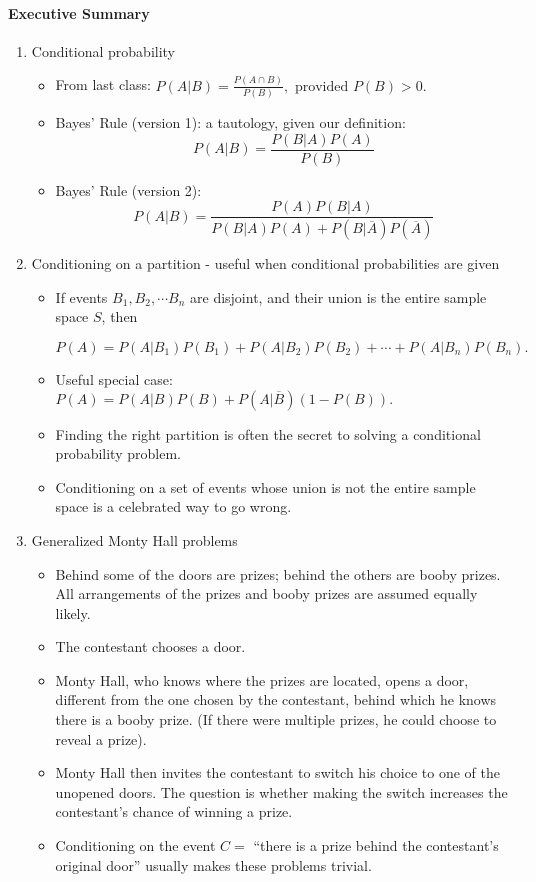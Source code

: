 \documentclass[12pt]{article}
\begin{document}
\paragraph*{Executive Summary}
\begin{enumerate}

\item Conditional probability
\begin{itemize}
\item From last class: $P(A | B) = \frac{P(A \cap B)}{P(B)}, \text{ provided } P(B) > 0.$

\item Bayes' Rule (version 1): a tautology, given our definition:  $$P(A | B) = \frac{P(B | A)P(A)}{P(B)}$$

\item Bayes' Rule (version 2): $$P(A | B) = \frac{P(A)P(B | A)}{P(B | A)P(A) + P(B|\overline{A})P(\overline{A})}$$
\end{itemize}

\item Conditioning on a partition - useful when conditional probabilities are given
\begin{itemize}
\item If events $B_1, B_2, \cdots B_n$ are disjoint, and their union is the entire sample space $S$, then

$P(A) = P(A | B_1)P(B_1) +  P(A | B_2)P(B_2) +  \cdots + P(A | B_n)P(B_n).$
\item Useful special case: $P(A) = P(A | B)P(B) +  P(A | \overline{B})(1-P(B)).$
\item Finding the right partition is often the secret to solving a conditional probability problem.
\item Conditioning on a set of events whose union is not the entire sample space is a celebrated way to go wrong.
\end{itemize}
\item Generalized Monty Hall problems

\begin{itemize}
\item Behind some of the doors are prizes; behind the others are booby prizes. All arrangements of the prizes and booby prizes are assumed equally likely.
\item The contestant chooses a door.
\item Monty Hall, who knows where the prizes are located, opens a door, different from the one chosen by the contestant, behind which he knows there is a booby prize. (If there were multiple prizes, he could choose to reveal a prize).
\item Monty Hall then invites the contestant to switch his choice to one of the unopened doors. The question is whether making the switch increases the contestant's chance of winning a prize.
\item Conditioning on the event $C=$ ``there is a prize behind the contestant's original door'' usually makes these problems trivial.
\end{itemize}
\end{enumerate}
\end{document}

